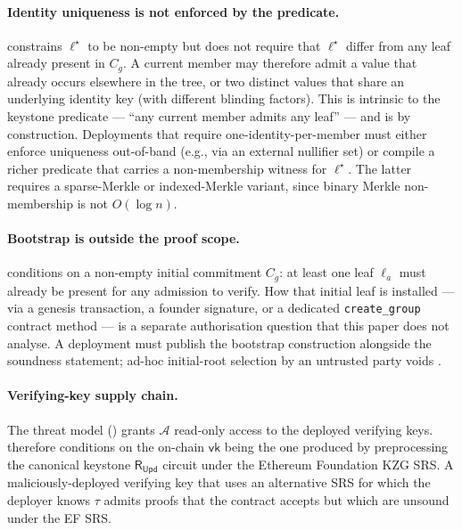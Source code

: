 \documentclass[11pt,a4paper]{article}
\theoremstyle{plain}
\theoremstyle{definition}
\newcommand{\Cg}{C_g}
\newcommand{\RUpd}{\mathsf{R}_{\mathsf{Upd}}}
\newcommand{\Adv}{\mathcal{A}}
\begin{document}
\paragraph{Identity uniqueness is not enforced by the predicate.}
 constrains $\ell^{\star}$ to be non-empty but
does not require that $\ell^{\star}$ differ from any leaf already
present in $\Cg$. A current member may therefore admit a value
that already occurs elsewhere in the tree, or two distinct values
that share an underlying identity key (with different blinding
factors). This is intrinsic to the keystone predicate ---
``any current member admits any leaf'' --- and is by construction.
Deployments that require one-identity-per-member must either
enforce uniqueness out-of-band (e.g., via an external nullifier
set) or compile a richer predicate that carries a non-membership
witness for $\ell^{\star}$. The latter requires a sparse-Merkle or
indexed-Merkle variant, since binary Merkle non-membership is not
$O(\log n)$.

\paragraph{Bootstrap is outside the proof scope.}
 conditions on a non-empty initial commitment
$\Cg$: at least one leaf $\ell_a$ must already be present for any
admission to verify. How that initial leaf is installed --- via a
genesis transaction, a founder signature, or a dedicated
\texttt{create\_group} contract method --- is a separate
authorisation question that this paper does not analyse. A
deployment must publish the bootstrap construction alongside the
soundness statement; ad-hoc initial-root selection by an untrusted
party voids .

\paragraph{Verifying-key supply chain.}
The threat model () grants $\Adv$ read-only
access to the deployed verifying keys.  therefore
conditions on the on-chain $\mathsf{vk}$ being the one produced
by preprocessing the canonical keystone $\RUpd$ circuit under
the Ethereum Foundation KZG SRS. A maliciously-deployed
verifying key that uses an alternative SRS for which the deployer
knows $\tau$ admits proofs that the contract accepts but which
are unsound under the EF SRS.
\end{document}
